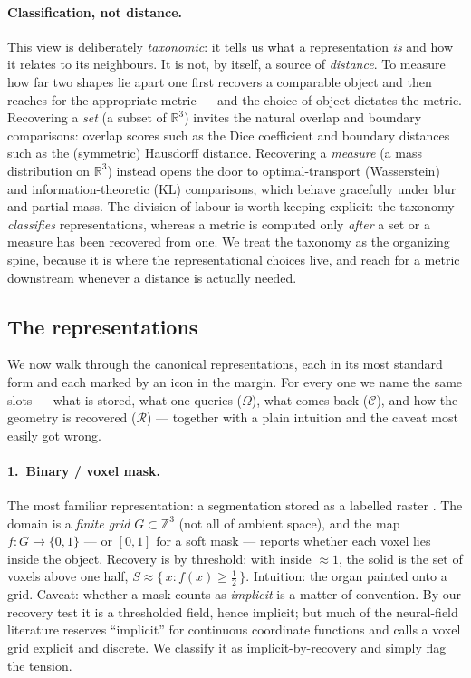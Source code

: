 \paragraph{Classification, not distance.} This view is deliberately \emph{taxonomic}:
it tells us what a representation \emph{is} and how it relates to its neighbours. It is
not, by itself, a source of \emph{distance}. To measure how far two shapes lie apart one
first recovers a comparable object and then reaches for the appropriate metric --- and
the choice of object dictates the metric. Recovering a \emph{set} (a subset of
$\mathbb{R}^3$) invites the natural overlap and boundary comparisons: overlap scores such
as the Dice coefficient and boundary distances such as the (symmetric) Hausdorff
distance. Recovering a \emph{measure} (a mass distribution on $\mathbb{R}^3$) instead
opens the door to optimal-transport (Wasserstein) and information-theoretic (KL)
comparisons, which behave gracefully under blur and partial mass. The division of labour
is worth keeping explicit: the taxonomy \emph{classifies} representations, whereas a
metric is computed only \emph{after} a set or a measure has been recovered from one. We
treat the taxonomy as the organizing spine, because it is where the representational
choices live, and reach for a metric downstream whenever a distance is actually needed.

\subsection{The representations}
\label{sec:shape-reps}

We now walk through the canonical representations, each in its most standard form and
each marked by an icon in the margin. For every one we name the same slots --- what is
stored, what one queries ($\Omega$), what comes back ($\mathcal{C}$), and how the geometry
is recovered ($\mathcal{R}$) --- together with a plain intuition and the caveat most
easily got wrong.

%
\paragraph{1.~Binary / voxel mask.} The most familiar representation: a segmentation
stored as a labelled raster \citep{isensee2021nnunet}. The domain is a \emph{finite grid}
$G \subset \mathbb{Z}^3$ (not all of ambient space), and the map $f : G \to \{0,1\}$ ---
or $[0,1]$ for a soft mask --- reports whether each voxel lies inside the object. Recovery
is by threshold: with inside $\approx 1$, the solid is the set of voxels above one half,
$S \approx \{\, x : f(x) \ge \tfrac12 \,\}$. Intuition: the organ painted onto a grid.
Caveat: whether a mask counts as \emph{implicit} is a matter of convention. By our
recovery test it is a thresholded field, hence implicit; but much of the neural-field
literature reserves ``implicit'' for continuous coordinate functions and calls a voxel
grid explicit and discrete. We classify it as implicit-by-recovery and simply flag the
tension.

